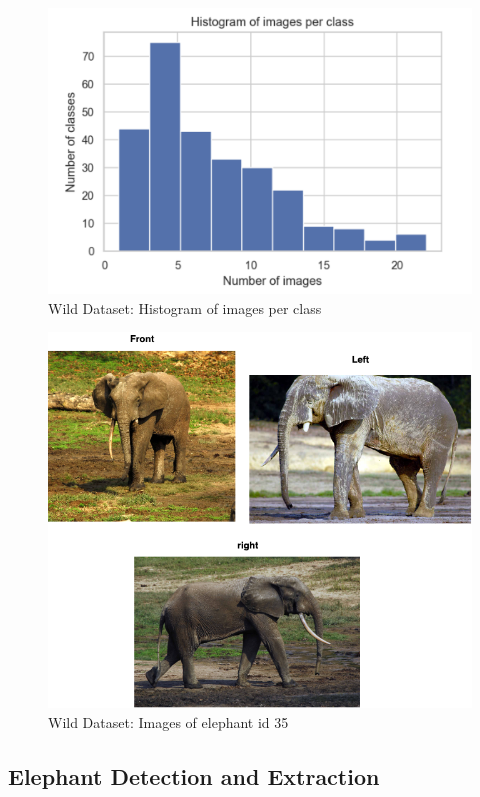\documentclass[10pt,twocolumn,letterpaper]{article}
\begin{document}
\begin{figure}[t]
  \centering
  \includegraphics[scale=0.32]{wild_histogram}
   \caption{Wild Dataset: Histogram of images per class}
   \label{fig:wild_histogram}
\end{figure}


\begin{figure}[t]
  \centering
  \includegraphics[scale=0.40]{wild_img_variations}
   \caption{Wild Dataset: Images of elephant id 35}
   \label{fig:wild_img_variations}
\end{figure}


\subsection{Elephant Detection and Extraction}
\end{document}
